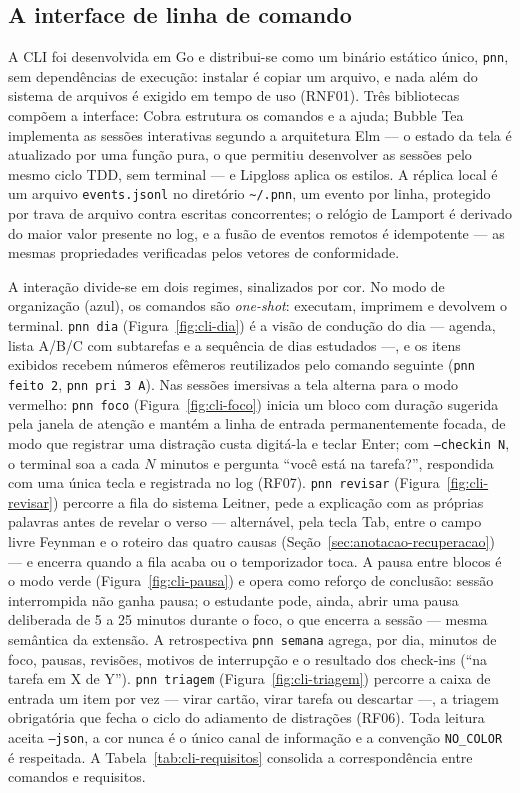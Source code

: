 \documentclass[12pt, %
openright, 
oneside,
a4paper,
english,   %
brazil]{facom-ufu-abntex2}
\begin{document}
\subsection{A interface de linha de comando}
\label{sub:cli}

A CLI foi desenvolvida em Go e distribui-se como um binário estático único,
\texttt{pnn}, sem dependências de execução: instalar é copiar um arquivo, e
nada além do sistema de arquivos é exigido em tempo de uso (RNF01). Três
bibliotecas compõem a interface: Cobra estrutura os comandos e a ajuda; Bubble
Tea implementa as sessões interativas segundo a arquitetura Elm --- o estado
da tela é atualizado por uma função pura, o que permitiu desenvolver as
sessões pelo mesmo ciclo TDD, sem terminal --- e Lipgloss aplica os estilos. A
réplica local é um arquivo \texttt{events.jsonl} no diretório
\texttt{\textasciitilde/.pnn}, um evento por linha, protegido por trava de
arquivo contra escritas concorrentes; o relógio de Lamport é derivado do maior
valor presente no log, e a fusão de eventos remotos é idempotente --- as
mesmas propriedades verificadas pelos vetores de conformidade.

A interação divide-se em dois regimes, sinalizados por cor. No modo de
organização (azul), os comandos são \textit{one-shot}: executam, imprimem e
devolvem o terminal. \texttt{pnn dia} (Figura~\ref{fig:cli-dia}) é a visão de
condução do dia --- agenda, lista A/B/C com subtarefas e a sequência de dias
estudados ---, e os itens exibidos recebem números efêmeros reutilizados pelo
comando seguinte (\texttt{pnn feito 2}, \texttt{pnn pri 3 A}). Nas sessões
imersivas a tela alterna para o modo vermelho: \texttt{pnn foco}
(Figura~\ref{fig:cli-foco}) inicia um bloco com duração sugerida pela janela
de atenção e mantém a linha de entrada permanentemente focada, de modo que
registrar uma distração custa digitá-la e teclar Enter; com
\texttt{--checkin N}, o terminal soa a cada $N$ minutos e pergunta ``você
está na tarefa?'', respondida com uma única tecla e registrada no log (RF07).
\texttt{pnn revisar} (Figura~\ref{fig:cli-revisar}) percorre a fila do
sistema Leitner, pede a explicação com as próprias palavras antes de revelar
o verso --- alternável, pela tecla Tab, entre o campo livre Feynman e o
roteiro das quatro causas (Seção~\ref{sec:anotacao-recuperacao}) --- e
encerra quando a fila acaba ou o temporizador toca. A pausa entre blocos é o
modo verde (Figura~\ref{fig:cli-pausa}) e opera como reforço de conclusão:
sessão interrompida não ganha pausa; o estudante pode, ainda, abrir uma pausa
deliberada de 5 a 25 minutos durante o foco, o que encerra a sessão ---
mesma semântica da extensão. A retrospectiva \texttt{pnn semana} agrega, por
dia, minutos de foco, pausas, revisões, motivos de interrupção e o resultado
dos check-ins (``na tarefa em X de Y''). \texttt{pnn triagem}
(Figura~\ref{fig:cli-triagem}) percorre a caixa de entrada um item por vez
--- virar cartão, virar tarefa ou descartar ---, a triagem obrigatória que
fecha o ciclo do adiamento de distrações (RF06). Toda
leitura aceita \texttt{--json}, a cor nunca é o único canal de informação e a
convenção \texttt{NO\_COLOR} é respeitada. A
Tabela~\ref{tab:cli-requisitos} consolida a correspondência entre comandos e
requisitos.
\end{document}
